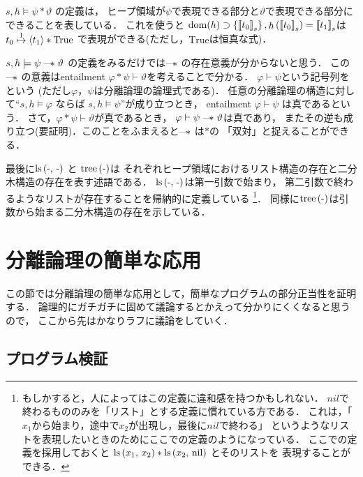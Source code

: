\documentclass[a4paper, 10pt]{ltjsarticle}
\begin{document}
 $s, h \models \psi * \vartheta$ の定義は，
 ヒープ領域が$\psi$で表現できる部分と$\vartheta$で表現できる部分に
 できることを表している．
 これを使うと 
 $\mathdom{h} \supset \left\{ \mathLdoubleko t_0 \mathRdoubleko _{s}  \right\}, \mathop{h}\left(\mathLdoubleko t_0 \mathRdoubleko _{s}\right) = \mathLdoubleko t_1 \mathRdoubleko _{s}$は$t_0 \mathrel{\overset{1}{\mapsto}} \left\langle t_1 \right\rangle * \mathrm{True}$
 で表現ができる(ただし，$\mathrm{True}$は恒真な式)．
 
 $s, h \models \psi \mathrel{\text{---}\!\!*} \vartheta$ 
 の定義をみるだけでは$\mathrel{\text{---}\!\!*}$ の存在意義が分からないと思う．
 この$\mathrel{\text{---}\!\!*}$ の意義はentailment 
 $\varphi * \psi \vdash \vartheta $を考えることで分かる．
 $\varphi \vdash \psi$という記号列を  という
 (ただし$\varphi$，$\psi$は分離論理の論理式である)．
 任意の分離論理の構造に対して``$s, h \models \varphi$ ならば 
 $s, h \models \psi$''が成り立つとき，
 entailment $\varphi \vdash \psi$ は真であるという．
 さて，$\varphi * \psi \vdash \vartheta $が真であるとき，
 $\varphi \vdash \psi \mathrel{\text{---}\!\!*} \vartheta $は真であり，
 またその逆も成り立つ(要証明)．このことをふまえると$\mathrel{\text{---}\!\!*}$ は$*$の
 「双対」と捉えることができる．

 最後に$\mathprls{\mathdash}{\mathchar`-}$ と $\mathprtree{\mathdash}$は
 それぞれヒープ領域におけるリスト構造の存在と二分木構造の存在を表す述語である．
 $\mathprls{\mathdash}{\mathchar`-}$は第一引数で始まり，
 第二引数で終わるようなリストが存在することを帰納的に定義している
 \footnote{もしかすると，人によってはこの定義に違和感を持つかもしれない．
 $nil$で終わるもののみを「リスト」とする定義に慣れている方である．
 これは，「$x_1$から始まり，途中で$x_2$が出現し，最後に$nil$で終わる」
 というようなリストを表現したいときのためにここでの定義のようになっている．
 ここでの定義を採用しておくと
 $\mathop{\mathrm{ls}}\left(x_1{,}\ x_2\right)*\mathop{\mathrm{ls}}\left(x_2{,}\ \mathrm{nil}\right)$ とそのリストを
 表現することができる．}．
 同様に$\mathprtree{\mathdash}$は引数から始まる二分木構造の存在を示している．

 \section{分離論理の簡単な応用}
 この節では分離論理の簡単な応用として，簡単なプログラムの部分正当性を証明する．
 論理的にガチガチに固めて議論するとかえって分かりにくくなると思うので，
 ここから先はかなりラフに議論をしていく．
 
 \subsection{プログラム検証}
  
\end{document}
